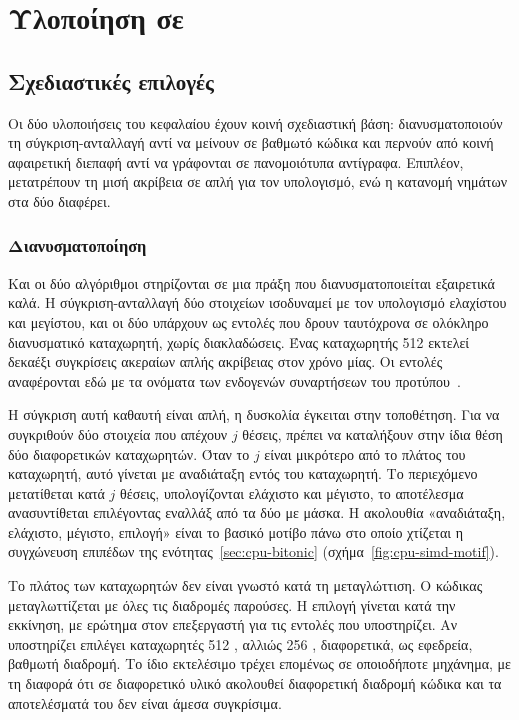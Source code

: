 \chapter{Υλοποίηση σε }
\label{ch:cpu}

\section{Σχεδιαστικές επιλογές}
\label{sec:cpu-design}

Οι δύο υλοποιήσεις του κεφαλαίου έχουν κοινή σχεδιαστική βάση: διανυσματοποιούν
τη σύγκριση-ανταλλαγή αντί να μείνουν σε βαθμωτό κώδικα και περνούν από κοινή
αφαιρετική διεπαφή αντί να γράφονται σε πανομοιότυπα αντίγραφα. Επιπλέον,
μετατρέπουν τη μισή ακρίβεια σε απλή για τον υπολογισμό, ενώ η κατανομή νημάτων
στα δύο διαφέρει.

\subsection{Διανυσματοποίηση}
\label{sec:cpu-simd}

Και οι δύο αλγόριθμοι στηρίζονται σε μια πράξη που διανυσματοποιείται
εξαιρετικά καλά. Η σύγκριση-ανταλλαγή δύο στοιχείων ισοδυναμεί με τον
υπολογισμό ελαχίστου και μεγίστου, και οι δύο υπάρχουν ως εντολές που δρουν
ταυτόχρονα σε ολόκληρο διανυσματικό καταχωρητή, χωρίς διακλαδώσεις. Ένας
καταχωρητής 512  εκτελεί δεκαέξι συγκρίσεις ακεραίων απλής ακρίβειας
στον χρόνο μίας. Οι εντολές αναφέρονται εδώ με τα ονόματα των ενδογενών
συναρτήσεων του προτύπου~\cite{intelintrinsics}.

Η σύγκριση αυτή καθαυτή είναι απλή, η δυσκολία έγκειται στην τοποθέτηση. Για να
συγκριθούν δύο στοιχεία που απέχουν $j$ θέσεις, πρέπει να καταλήξουν στην ίδια
θέση δύο διαφορετικών καταχωρητών. Όταν το $j$ είναι μικρότερο από το πλάτος
του καταχωρητή, αυτό γίνεται με αναδιάταξη εντός του καταχωρητή. Το περιεχόμενο
μετατίθεται κατά $j$ θέσεις, υπολογίζονται ελάχιστο και μέγιστο, το αποτέλεσμα
ανασυντίθεται επιλέγοντας εναλλάξ από τα δύο με μάσκα. Η ακολουθία «αναδιάταξη,
ελάχιστο, μέγιστο, επιλογή» είναι το βασικό μοτίβο πάνω στο οποίο χτίζεται η
συγχώνευση επιπέδων της ενότητας~\ref{sec:cpu-bitonic}
(σχήμα~\ref{fig:cpu-simd-motif}).



Το πλάτος των καταχωρητών δεν είναι γνωστό κατά τη μεταγλώττιση. Ο κώδικας
μεταγλωττίζεται με όλες τις διαδρομές παρούσες. Η επιλογή γίνεται κατά την
εκκίνηση, με ερώτημα στον επεξεργαστή για τις εντολές που υποστηρίζει. Αν
υποστηρίζει  επιλέγει καταχωρητές 512 , αλλιώς 256
, διαφορετικά, ως εφεδρεία, βαθμωτή διαδρομή. Το ίδιο εκτελέσιμο τρέχει
επομένως σε οποιοδήποτε μηχάνημα, με τη διαφορά ότι σε διαφορετικό υλικό
ακολουθεί διαφορετική διαδρομή κώδικα και τα αποτελέσματά του δεν είναι άμεσα
συγκρίσιμα.


